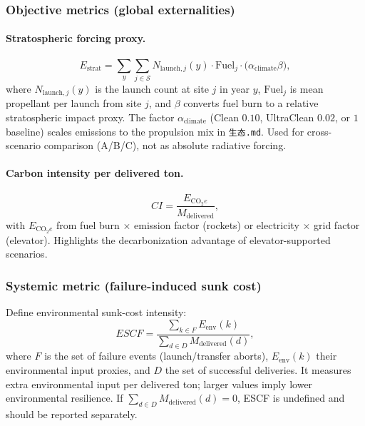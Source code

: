 ﻿\documentclass{mcmthesis}
\begin{document}
\subsubsection{Objective metrics (global externalities)}
\paragraph{Stratospheric forcing proxy.}
\begin{equation}
E_{\text{strat}}=\sum_{y}\sum_{j\in\mathcal{S}} N_{\text{launch},j}(y)\cdot \text{Fuel}_j \cdot \big(\alpha_{\text{climate}}\beta\big),
\end{equation}
where $N_{\text{launch},j}(y)$ is the launch count at site $j$ in year $y$, $\text{Fuel}_j$ is mean propellant per launch from site $j$, and $\beta$ converts fuel burn to a relative stratospheric impact proxy. The factor $\alpha_{\text{climate}}$ (Clean $0.10$, UltraClean $0.02$, or $1$ baseline) scales emissions to the propulsion mix in \texttt{生态.md}. Used for cross-scenario comparison (A/B/C), not as absolute radiative forcing.

\paragraph{Carbon intensity per delivered ton.}
\begin{equation}
CI=\frac{E_{\text{CO}_2e}}{M_{\text{delivered}}},
\end{equation}
with $E_{\text{CO}_2e}$ from fuel burn $\times$ emission factor (rockets) or electricity $\times$ grid factor (elevator). Highlights the decarbonization advantage of elevator-supported scenarios.

\subsubsection{Systemic metric (failure-induced sunk cost)}
Define environmental sunk-cost intensity:
\begin{equation}
ESCF=\frac{\sum_{k\in F} E_{\text{env}}(k)}{\sum_{d\in D} M_{\text{delivered}}(d)},
\end{equation}
where $F$ is the set of failure events (launch/transfer aborts), $E_{\text{env}}(k)$ their environmental input proxies, and $D$ the set of successful deliveries. It measures extra environmental input per delivered ton; larger values imply lower environmental resilience. If $\sum_{d\in D} M_{\text{delivered}}(d)=0$, ESCF is undefined and should be reported separately.
\end{document}
